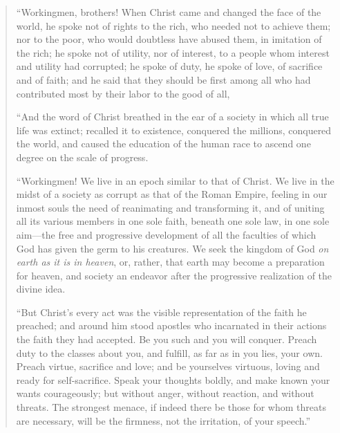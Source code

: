 \documentclass{book}
\begin{document}
\begin{quotation}
	“Workingmen, brothers! When Christ came and changed the face of the world, he spoke not of rights to the rich, who needed not to achieve them; nor to the poor, who would doubtless have abused them, in imitation of the rich; he spoke not of utility, nor of interest, to a people whom interest and utility had corrupted; he spoke of duty, he spoke of love, of sacrifice and of faith; and he said that they should be first among all who had contributed most by their labor to the good of all,

	“And the word of Christ breathed in the ear of a society in which all true life was extinct; recalled it to existence, conquered the millions, conquered the world, and caused the education of the human race to ascend one degree on the scale of progress.

	“Workingmen! We live in an epoch similar to that of Christ. We live in the midst of a society as corrupt as that of the Roman Empire, feeling in our inmost souls the need of reanimating and transforming it, and of uniting all its various members in one sole faith, beneath one sole law, in one sole aim—the free and progressive development of all the faculties of which God has given the germ to his creatures. We seek the kingdom of God \emph{on earth as it is in heaven}, or, rather, that earth may become a preparation for heaven, and society an endeavor after the progressive realization of the divine idea.

	“But Christ’s every act was the visible representation of the faith he preached; and around him stood apostles who incarnated in their actions the faith they had accepted. Be you such and you will conquer. Preach duty to the classes about you, and fulfill, as far as in you lies, your own. Preach virtue, sacrifice and love; and be yourselves virtuous, loving and ready for self-sacrifice. Speak your thoughts boldly, and make known your wants courageously; but without anger, without reaction, and without threats. The strongest menace, if indeed there be those for whom threats are necessary, will be the firmness, not the irritation, of your speech.”
\end{quotation}

\end{document}
